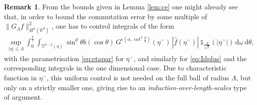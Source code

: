 \documentclass[11pt,a4paper,reqno]{amsart}
\theoremstyle{plain}
\theoremstyle{definition}
\newtheorem{remark}[proposition]{Remark}
\begin{document}
\begin{remark}
From the bounds given in Lemma \ref{lem:ce} one might already see that, in order to bound the commutation error by some multiple of $\|G_{\Lambda}f\|_{H^{\alpha}({\mathbb{R}}^d)}^2$, one has to control integrals of the form
\begin{align*}
  \sup_{|\eta|\le \Lambda}\int_{0}^{\tfrac{\pi}{2}}  \int_{{\mathbb{S}}^{d-2}(\eta)} \sin^{d}\theta b(\cos\theta)\, G^{\epsilon\left(\alpha, \cot^2\tfrac{\theta}{2}\right)}(\eta^-)\,|\hat{f}(\eta^-)| \, {\mathds{1}}_{\tfrac{\Lambda}{\sqrt{2}}}(|\eta^-|) \,\mathrm{d}\omega\,\mathrm{d}\theta,
\end{align*}
with the parametrisation \eqref{eq:etapar} for $\eta^-$, and similarly for \eqref{eq:Idplus} and the corresponding integrals in the one dimensional case. Due to characteristic function in $\eta^-$, this uniform control is not needed on the full ball of radius $\Lambda$, but only on a strictly smaller one, giving rise to an \emph{induction-over-length-scales} type of argument.
\end{remark}
\end{document}
